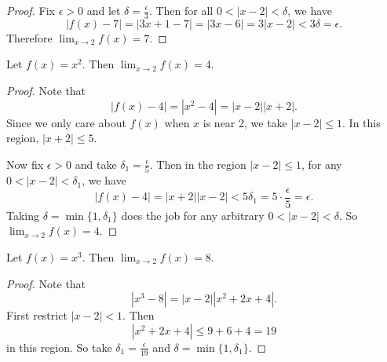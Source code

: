 \begin{proof}
  Fix $\epsilon > 0$ and let $\delta = \frac{\epsilon}{3}$.
  Then for all $0 < |x - 2| < \delta$, we have
  \[|f(x) - 7| = |3x + 1 - 7| = |3x - 6| = 3|x - 2|
  < 3\delta = \epsilon.\]
  Therefore $\lim_{x \to 2} f(x) = 7$.
\end{proof}

\begin{exercise}
  Let $f(x) = x^2$. Then $\lim_{x \to 2} f(x) = 4$.
\end{exercise}

\begin{proof}
  Note that
  \[|f(x) - 4| = |x^2 - 4| = |x - 2| |x + 2|.\]
  Since we only care about $f(x)$ when $x$ is near 2,
  we take $|x - 2| \le 1$. In this region,
  $|x + 2| \le 5$.

  Now fix $\epsilon > 0$ and take
  $\delta_1 = \frac{\epsilon}{5}$. Then in the region
  $|x - 2| \le 1$, for any $0 < |x - 2| < \delta_1$, we have
  \[|f(x) - 4| = |x + 2||x - 2| < 5 \delta_1 = 5 \cdot \frac{\epsilon}{5} = \epsilon.\]
  Taking $\delta = \min\{1, \delta_1\}$ does the job
  for any arbitrary $0 < |x - 2| < \delta$. So
  $\lim_{x \to 2} f(x) = 4$.
\end{proof}

\begin{exercise}
  Let $f(x) = x^3$. Then $\lim_{x \to 2} f(x) = 8$.
\end{exercise}

\begin{proof}
  Note that
  \[|x^3 - 8| = |x - 2| |x^2 + 2x + 4|.\]
  First restrict $|x - 2| < 1$. Then
  \[|x^2 + 2x + 4| \le 9 + 6 + 4 = 19\]
  in this region. So take
  $\delta_1 = \frac{\epsilon}{19}$ and
  $\delta = \min\{1, \delta_1\}$.
\end{proof}
